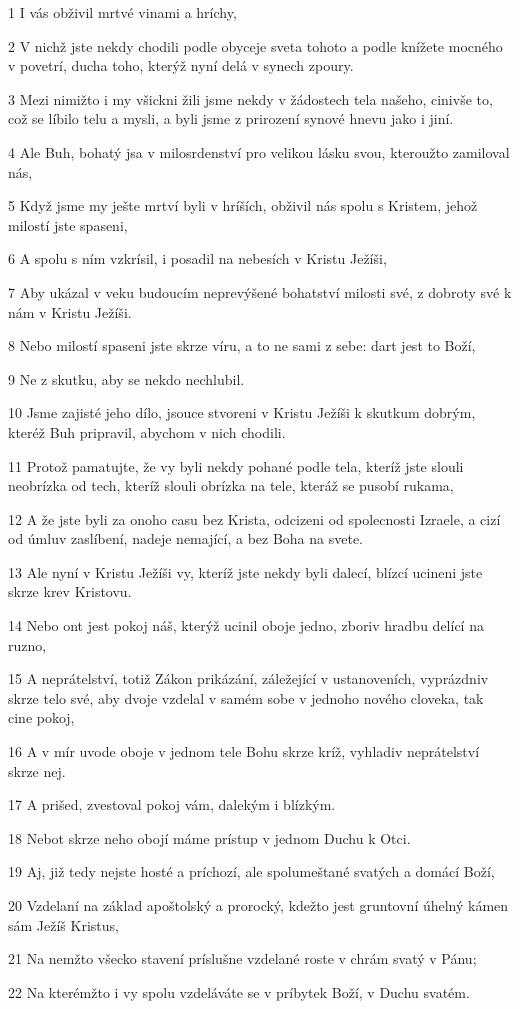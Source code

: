 \par 1 I vás obživil mrtvé vinami a hríchy,
\par 2 V nichž jste nekdy chodili podle obyceje sveta tohoto a podle knížete mocného v povetrí, ducha toho, kterýž nyní delá v synech zpoury.
\par 3 Mezi nimižto i my všickni žili jsme nekdy v žádostech tela našeho, cinivše to, což se líbilo telu a mysli, a byli jsme z prirození synové hnevu jako i jiní.
\par 4 Ale Buh, bohatý jsa v milosrdenství pro velikou lásku svou, kteroužto zamiloval nás,
\par 5 Když jsme my ješte mrtví byli v hríších, obživil nás spolu s Kristem, jehož milostí jste spaseni,
\par 6 A spolu s ním vzkrísil, i posadil na nebesích v Kristu Ježíši,
\par 7 Aby ukázal v veku budoucím neprevýšené bohatství milosti své, z dobroty své k nám v Kristu Ježíši.
\par 8 Nebo milostí spaseni jste skrze víru, a to ne sami z sebe: dart jest to Boží,
\par 9 Ne z skutku, aby se nekdo nechlubil.
\par 10 Jsme zajisté jeho dílo, jsouce stvoreni v Kristu Ježíši k skutkum dobrým, kteréž Buh pripravil, abychom v nich chodili.
\par 11 Protož pamatujte, že vy byli nekdy pohané podle tela, kteríž jste slouli neobrízka od tech, kteríž slouli obrízka na tele, kteráž se pusobí rukama,
\par 12 A že jste byli za onoho casu bez Krista, odcizeni od spolecnosti Izraele, a cizí od úmluv zaslíbení, nadeje nemající, a bez Boha na svete.
\par 13 Ale nyní v Kristu Ježíši vy, kteríž jste nekdy byli dalecí, blízcí ucineni jste skrze krev Kristovu.
\par 14 Nebo ont jest pokoj náš, kterýž ucinil oboje jedno, zboriv hradbu delící na ruzno,
\par 15 A neprátelství, totiž Zákon prikázání, záležející v ustanoveních, vyprázdniv skrze telo své, aby dvoje vzdelal v samém sobe v jednoho nového cloveka, tak cine pokoj,
\par 16 A v mír uvode oboje v jednom tele Bohu skrze kríž, vyhladiv neprátelství skrze nej.
\par 17 A prišed, zvestoval pokoj vám, dalekým i blízkým.
\par 18 Nebot skrze neho obojí máme prístup v jednom Duchu k Otci.
\par 19 Aj, již tedy nejste hosté a príchozí, ale spolumeštané svatých a domácí Boží,
\par 20 Vzdelaní na základ apoštolský a prorocký, kdežto jest gruntovní úhelný kámen sám Ježíš Kristus,
\par 21 Na nemžto všecko stavení príslušne vzdelané roste v chrám svatý v Pánu;
\par 22 Na kterémžto i vy spolu vzdeláváte se v príbytek Boží, v Duchu svatém.

